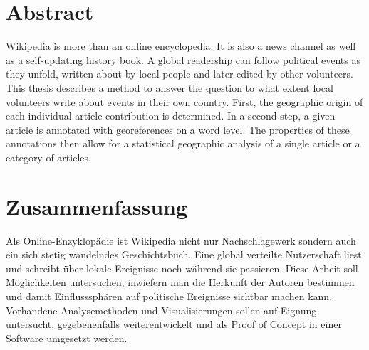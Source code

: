 \begingroup
\let\clearpage\relax
\let\cleardoublepage\relax
\let\cleardoublepage\relax

\chapter*{Abstract}

Wikipedia is more than an online encyclopedia. 
It is also a news channel as well as a self-updating history book.
A global readership can follow political events as they unfold, written about by local people and later edited by other volunteers.
This thesis describes a method to answer the question to what extent local volunteers write about events in their own country.
First, the geographic origin of each individual article contribution is determined.
In a second step, a given article is annotated with georeferences on a word level.
The properties of these annotations then allow for a statistical geographic analysis of a single article or a category of articles.

\vfill

\chapter*{Zusammenfassung}


Als Online-Enzyklopädie ist Wikipedia nicht nur Nachschlagewerk sondern auch 
ein sich stetig wandelndes Geschichtsbuch. Eine global verteilte Nutzerschaft liest 
und schreibt über lokale Ereignisse noch während sie passieren. Diese Arbeit soll
Möglichkeiten untersuchen, inwiefern man die Herkunft der Autoren bestimmen
und damit Einflusssphären auf politische Ereignisse sichtbar machen kann. 
Vorhandene Analysemethoden und Visualisierungen sollen auf Eignung untersucht, 
gegebenenfalls weiterentwickelt und als Proof of Concept in einer Software umgesetzt werden.

\endgroup			

\vfill